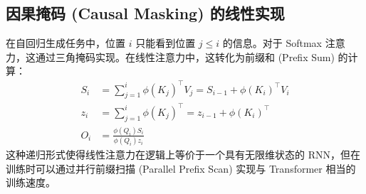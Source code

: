 \subsection{因果掩码 (Causal Masking) 的线性实现}
在自回归生成任务中，位置 $i$ 只能看到位置 $j \leq i$ 的信息。对于 Softmax 注意力，这通过三角掩码实现。在线性注意力中，这转化为前缀和 (Prefix Sum) 的计算：
\begin{align}
    S_i &= \sum_{j=1}^i \phi(K_j)^\top V_j = S_{i-1} + \phi(K_i)^\top V_i \\
    z_i &= \sum_{j=1}^i \phi(K_j)^\top = z_{i-1} + \phi(K_i)^\top \\
    O_i &= \frac{\phi(Q_i) S_i}{\phi(Q_i) z_i}
\end{align}
这种递归形式使得线性注意力在逻辑上等价于一个具有无限维状态的 RNN，但在训练时可以通过并行前缀扫描 (Parallel Prefix Scan) 实现与 Transformer 相当的训练速度。
